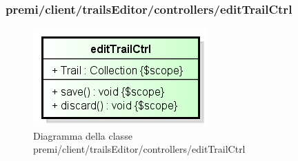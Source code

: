 \subsubsection{premi/client/trailsEditor/controllers/editTrailCtrl}
\begin{figure}[H]
\begin{center}
\includegraphics[scale=0.95]{img/diacla/editTrailCtrl.png}
\caption{Diagramma della classe premi/client/trailsEditor/controllers/editTrailCtrl}
\end{center}
\end{figure}


